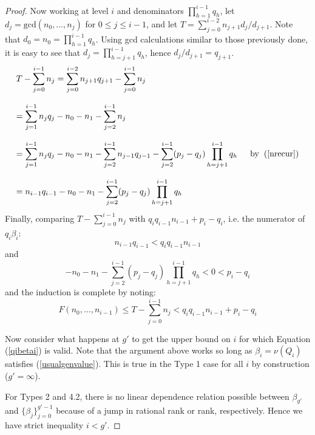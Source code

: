 \documentclass[11pt]{amsart}
\theoremstyle{definition}
\begin{document}
{\begin{proof}
Now working at level $i$ and denominators $\prod_{h=1}^{i-1} q_h$, let $d_j=\text{gcd}(n_0,\ldots,n_j)$ for $0\leq j\leq i-1$, and let $\displaystyle T=\sum_{j=0}^{i-2} n_{j+1}d_j/d_{j+1}$. Note that $d_0=n_0=\prod_{h=1}^{i-1}q_h$. Using gcd calculations similar to those previously done, it is easy to see that $d_j=\prod_{h=j+1}^{i-1}q_h$, hence $d_j/d_{j+1}=q_{j+1}$.
\begin{equation*}
\begin{array}{l}
\displaystyle T-\sum_{j=0}^{i-1}n_j =\sum_{j=0}^{i-2} n_{j+1}q_{j+1}-\sum_{j=0}^{i-1}n_j
\\\\
 = \displaystyle \sum_{j=1}^{i-1}n_jq_j-n_0-n_1-\sum_{j=2}^{i-1} n_j
\\\\
 = \displaystyle \sum_{j=1}^{i-1}n_jq_j-n_0-n_1-\sum_{j=2}^{i-1} n_{j-1}q_{j-1} - \sum_{j=2}^{i-1} (p_j-q_j)\prod_{h=j+1}^{i-1} q_h  \indent \text{by}\left.\right.(\ref{nrecur})
\\\\
 = \displaystyle n_{i-1}q_{i-1}-n_0-n_1-\sum_{j=2}^{i-1} (p_j-q_j)\prod_{h=j+1}^{i-1} q_h
\end{array}
\end{equation*}
Finally, comparing $T-\sum_{j=0}^{i-1}n_j$ with $q_iq_{i-1}n_{i-1}+p_i-q_i$, i.e. the numerator of $q_i\beta_i$:
\begin{equation*}
n_{i-1}q_{i-1} < q_iq_{i-1}n_{i-1}
\end{equation*}
and
\begin{equation*}
-n_0-n_1-\sum_{j=2}^{i-1}(p_j-q_j)\prod_{h=j+1}^{i-1} q_h \left.\right.<\left.\right. 0 \left.\right.<\left.\right. p_i-q_i
\end{equation*}
and the induction is complete by noting:
\begin{equation*}
F(n_0,\ldots,n_{i-1}) \leq T-\sum_{j=0}^{i-1}n_j<q_iq_{i-1}n_{i-1}+p_i-q_i
\end{equation*}

Now consider what happens at $g'$ to get the upper bound on $i$ for which Equation (\ref{qibetai}) is valid. Note that the argument above works so long as $\beta_i=\nu(Q_i)$ satisfies (\ref{usualgenvalue}). This is true in the Type 1 case for all $i$ by construction ($g'=\infty$).

For Types 2 and 4.2, there is no linear dependence relation possible between $\beta_{g'}$ and $\displaystyle \{\beta_j\}_{j=0}^{g'-1}$ because of a jump in rational rank or rank, respectively. Hence we have strict inequality $i<g'$.


\end{proof}}
\end{document}
